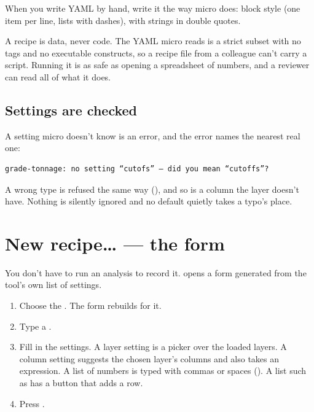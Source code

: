 When you write YAML by hand, write it the way micro does: block style (one item per line, lists with dashes), with strings in double quotes.

\begin{why}
A recipe is data, never code. The YAML micro reads is a strict subset with no tags and no executable constructs, so a recipe file from a colleague can't carry a script. Running it is as safe as opening a spreadsheet of numbers, and a reviewer can read all of what it does.
\end{why}

\subsection{Settings are checked}
A setting micro doesn't know is an error, and the error names the nearest real one:

\begin{lstlisting}
grade-tonnage: no setting “cutofs” — did you mean “cutoffs”?
\end{lstlisting}

A wrong type is refused the same way (), and so is a column the layer doesn't have. Nothing is silently ignored and no default quietly takes a typo's place.

\section{New recipe… — the form}\label{sec:recipes-form}
You don't have to run an analysis to record it.  opens a form generated from the tool's own list of settings.


\begin{enumerate}
\item Choose the . The form rebuilds for it.
\item Type a .
\item Fill in the settings. A layer setting is a picker over the loaded layers. A column setting suggests the chosen layer's columns and also takes an expression. A list of numbers is typed with commas or spaces (). A list such as  has a  button that adds a row.
\item Press .
\end{enumerate}

